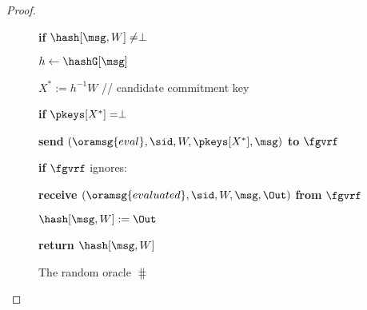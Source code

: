 \begin{proof}
\begin{itemize}
\begin{figure}
\begin{minipage}{0.6\textwidth}
{{						\textbf{if} $\mathtt{\hash}[\msg, W] \neq \perp $
						
						
						
						
						
						{$ h \leftarrow \mathtt{\hashG}[\msg] $}
						
						{$ X^* := h^{-1}W $ // candidate commitment key} 
						
						
						{\textbf{if} $ \pkeys[X^*]  = \perp$}
						
						\tabdbl{$ \pk^* \leftsample \grE $} %
						
						\tabdbl{$ \pkeys[X^*] := \pk^* $}
						
						{\textbf{send} $ (\oramsg{eval}, \sid, W, \pkeys[X^*] , \msg) $ \textbf{to} $ \fgvrf $}
						
						{\textbf{if} $ \fgvrf $ ignores: }
						
						{\textbf{receive} $ (\oramsg{evaluated}, \sid, W, \msg, \Out) $ \textbf{from} $ \fgvrf $}
						
						{$ \mathtt{\hash}[\msg, W]:=\Out $}
						
%						
%						
						
						
						\textbf{return $ \mathtt{\hash}[\msg,  W] $}
						
				}}	
				\caption{The random oracle $ \hash $}
				\label{oracle:HnoPK}
			\end{minipage}
		\end{figure}
		



\end{itemize}
\end{proof}
